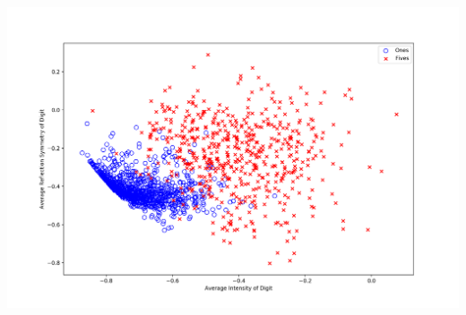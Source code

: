 \documentclass{article}
\begin{document}
\begin{enumerate}[(a)]
    \includegraphics[width=\textwidth]{handwrittenfeatures.png}

\end{enumerate}
\end{document}
